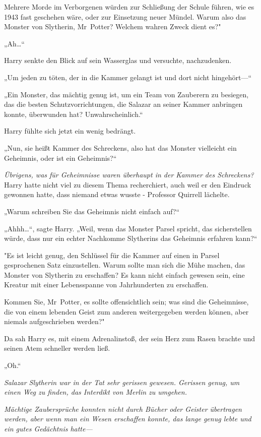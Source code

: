 {Mehrere Morde im Verborgenen würden zur Schließung der Schule führen, wie es 1943 fast geschehen wäre, oder zur Einsetzung neuer Mündel. Warum also das Monster von Slytherin, Mr~Potter? Welchem wahren Zweck dient es?"

„Ah…“

Harry senkte den Blick auf sein Wasserglas und versuchte, nachzudenken.

„Um jeden zu töten, der in die Kammer gelangt ist und dort nicht hingehört—“

„Ein Monster, das mächtig genug ist, um ein Team von Zauberern zu besiegen, das die besten Schutzvorrichtungen, die Salazar an seiner Kammer anbringen konnte, überwunden hat? Unwahrscheinlich.“

Harry fühlte sich jetzt ein wenig bedrängt.

„Nun, sie heißt Kammer des Schreckens, also hat das Monster vielleicht ein Geheimnis, oder ist ein Geheimnis?“

\emph{Übrigens, was für Geheimnisse waren überhaupt in der Kammer des Schreckens?} Harry hatte nicht viel zu diesem Thema recherchiert, auch weil er den Eindruck gewonnen hatte, dass niemand etwas wusste - Professor Quirrell lächelte.

„Warum schreiben Sie das Geheimnis nicht einfach auf?“

„Ahhh…“, sagte Harry. „Weil, wenn das Monster Parsel spricht, das sicherstellen würde, dass nur ein echter Nachkomme Slytherins das Geheimnis erfahren kann?“

"Es ist leicht genug, den Schlüssel für die Kammer auf einen in Parsel gesprochenen Satz einzustellen. Warum sollte man sich die Mühe machen, das Monster von Slytherin zu erschaffen? Es kann nicht einfach gewesen sein, eine Kreatur mit einer Lebensspanne von Jahrhunderten zu erschaffen.

Kommen Sie, Mr~Potter, es sollte offensichtlich sein; was sind die Geheimnisse, die von einem lebenden Geist zum anderen weitergegeben werden können, aber niemals aufgeschrieben werden?"

Da sah Harry es, mit einem Adrenalinstoß, der sein Herz zum Rasen brachte und seinen Atem schneller werden ließ.

„Oh.“

\emph{Salazar Slytherin war in der Tat sehr gerissen gewesen. Gerissen genug, um einen Weg zu finden, das Interdikt von Merlin zu umgehen.}

\emph{Mächtige Zaubersprüche konnten nicht durch Bücher oder Geister übertragen werden, aber wenn man ein Wesen erschaffen konnte, das lange genug lebte und ein gutes Gedächtnis hatte—}

}

